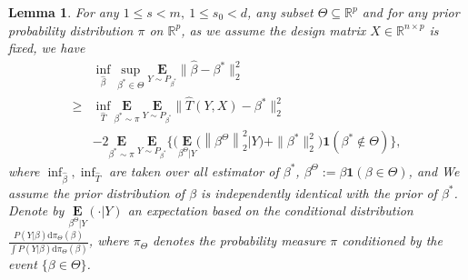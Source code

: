 \documentclass[12pt]{article}
\newtheorem{lemma}{Lemma}
\begin{document}
\begin{appendix}
\begin{lemma}\label{lemma:minimaxori}
For any $1\le s<m,~1\le s_0<d$, any subset ${\Theta} \subseteq \mathbb R^p$ and for any prior probability distribution $\pi$ on $\mathbb R^p$, as we assume the design matrix $X \in \mathbb R^{n \times p}$ is fixed, we have
\begin{equation}\label{lemma1.ineq}
\begin{aligned} 
&\inf_{\hat \beta} \sup_{\beta^* \in {\Theta}} \underset{Y \sim P_{\beta^*}}{\mathbf{E}}\|\hat \beta - \beta^* \|_2^2 \\
\ge & \inf_{\hat T  } \underset{\beta^* \sim \pi}{\mathbf{E}}~ 
      \underset{Y \sim P_{\beta^*}}{\mathbf{E}} \|\hat T(Y,X) - \beta^* \|_2^2\\
& - 2\underset{\beta^* \sim \pi}{\mathbf {E}}~ \underset{Y \sim P_{\beta^*}}{\mathbf{E}}
      \Bigg\{\bigg(\underset{\beta^{ {\Theta}} | Y}{\mathbf{E} }\Big(\left\|\beta^{ {\Theta}}\right\|_2^2 \big| Y\Big)+\|\beta^*\|_2^2\bigg) \mathbf{1}\left(\beta^* \notin {\Theta} \right)\Bigg\},
\end{aligned}
\end{equation}
where $\inf_{\hat \beta}, \inf_{\hat T  }$ are taken over all estimator of $\beta^*$, $\beta^{ {\Theta}}:= \beta \mathbf1(\beta \in {\Theta})$, and We assume the prior distribution of $\beta $ is independently identical with the prior of $\beta^{*}$. 
Denote by $\underset{\beta^{ {\Theta}} | Y}{\mathbf{E} }(\cdot|Y)$ an expectation based on the conditional distribution $\frac{ P(Y|\beta) \mathrm d \pi_{\Theta}(\beta) }{ \int  P(Y|\beta ) \mathrm d \pi_{\Theta}(\beta ) }$, where $\pi_{\Theta}$ denotes the probability measure $\pi$ conditioned by the event $\{ \beta \in {\Theta} \}$.
\end{lemma}



\end{appendix}
\end{document}
